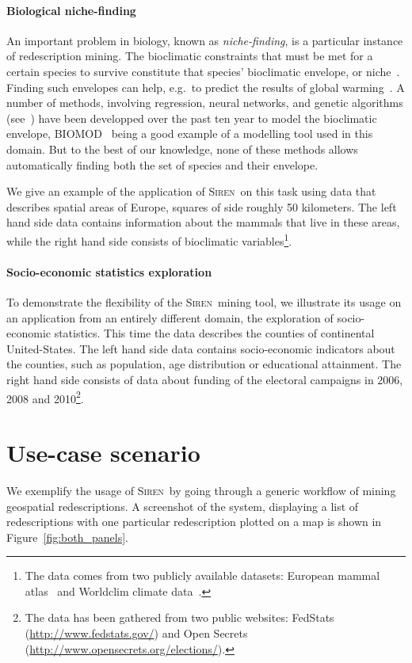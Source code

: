 \documentclass{sig-alternate}
\newcommand{\prg}[1]{\paragraph{#1}}
\newcommand{\Siren}{\textsc{Siren}}
\begin{document}
\prg{Biological niche-finding} 
An important problem in biology, known as \emph{niche-finding}, is a
particular instance of redescription mining.  The bioclimatic
constraints that must be met for a certain species to survive
constitute that species' bioclimatic envelope, or
niche~\cite{grinnell17niche}.  Finding such envelopes can help, e.g.\
to predict the results of global warming~\cite{pearson03predicting}.
A number of methods, involving regression, neural networks, and
genetic algorithms (see~\cite{soberon05interpretation}) have been
developped over the past ten year to model the bioclimatic envelope,
\textsc{BIOMOD}~\cite{thuiller09biomod} being a good example of a
modelling tool used in this domain.  But to the best of our knowledge,
none of these methods allows automatically finding both the set of
species and their envelope.

We give an example of the application of \Siren\ on this task using data
that describes spatial areas of Europe, squares of side roughly 50
kilometers.  The left hand side data contains information about the
mammals that live in these areas, while the right hand side consists
of bioclimatic variables\footnote{The data comes from two publicly available
datasets: European mammal atlas~\cite{mitchell-jones99atlas} and
Worldclim climate data~\cite{hijmans05very}.}.

\prg{Socio-economic statistics exploration}


To demonstrate the flexibility of the \Siren\ mining tool, we illustrate its usage on
an application from an entirely different domain, the exploration of socio-economic statistics. This time the data describes the counties
of continental United-States.  The left hand side data
contains socio-economic indicators about the counties, such as
population, age distribution or educational attainment. The right hand
side consists of data about funding of the electoral campaigns in
2006, 2008 and 2010\footnote{The data has been gathered from two public
websites: FedStats (\url{http://www.fedstats.gov/}) and Open
Secrets (\url{http://www.opensecrets.org/elections/}).}.


\section{Use-case scenario}
\label{sec:scenarios}
We exemplify the usage of \Siren\ by going through a generic workflow of
mining geospatial redescriptions.  A screenshot of the system,
displaying a list of redescriptions with one
particular redescription plotted on a map is shown in
Figure~\ref{fig:both_panels}.
\end{document}
